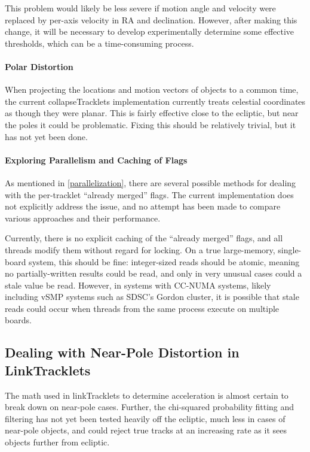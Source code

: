 This problem would likely be less severe if motion angle and velocity
were replaced by per-axis velocity in RA and declination.  However,
after making this change, it will be necessary to develop
experimentally determine some effective thresholds, which can be a
time-consuming process.

\paragraph{Polar Distortion}
When projecting the locations and motion vectors of objects to a
common time, the current collapseTracklets implementation currently
treats celestial coordinates as though they were planar.  This is
fairly effective close to the ecliptic, but near the poles it could be
problematic.  Fixing this should be relatively trivial, but it has not
yet been done.

\paragraph{Exploring Parallelism and Caching of Flags}
As mentioned in \ref{parallelization}, there are several possible
methods for dealing with the per-tracklet ``already merged'' flags.
The current implementation does not explicitly address the issue,
and no attempt has been made to compare various approaches and their
performance.

Currently, there is no explicit caching of the ``already merged''
flags, and all threads modify them without regard for locking.  On a
true large-memory, single-board system, this should be fine:
integer-sized reads should be atomic, meaning no partially-written
results could be read, and only in very unusual cases could a stale
value be read. However, in systems with CC-NUMA systems, likely
including vSMP systems such as SDSC's Gordon cluster, it is possible
that stale reads could occur when threads from the same process
execute on multiple boards.


\subsection{Dealing with Near-Pole Distortion in LinkTracklets}

The math used in linkTracklets to determine acceleration is almost
certain to break down on near-pole cases.  Further, the chi-squared
probability fitting and filtering has not yet been tested heavily off
the ecliptic, much less in cases of near-pole objects, and could
reject true tracks at an increasing rate as it sees objects further
from ecliptic.

